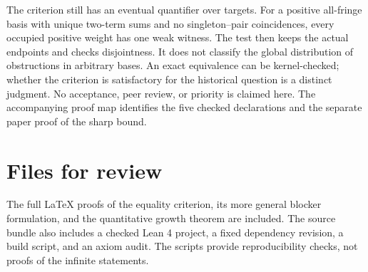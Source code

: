 \documentclass[11pt]{article}
\begin{document}
The criterion still has an eventual quantifier over targets.
For a positive all-fringe basis with unique two-term sums and no
singleton--pair coincidences, every occupied positive weight has one
weak witness. The test then keeps the actual endpoints and checks
disjointness. It does not classify the global distribution of
obstructions in arbitrary bases. An exact equivalence can be
kernel-checked; whether the criterion is satisfactory for the
historical question is a distinct judgment. No acceptance,
peer review, or priority is claimed here. The accompanying
proof map identifies the five checked declarations and the
separate paper proof of the sharp bound.

\section{Files for review}
The full LaTeX proofs of the equality criterion, its more general
blocker formulation, and the quantitative growth theorem are
included. The source bundle also includes a checked Lean 4 project,
a fixed dependency revision, a build script, and an axiom audit.
The scripts provide reproducibility checks, not proofs of
the infinite statements.
\end{document}

